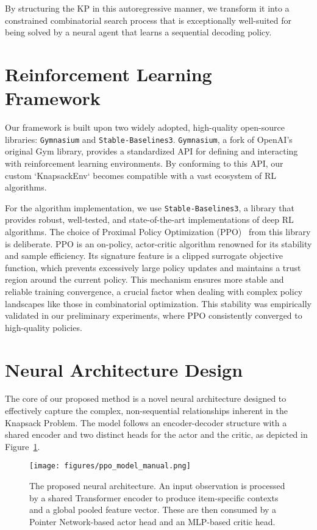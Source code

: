 By structuring the KP in this autoregressive manner, we transform it into a constrained combinatorial search process that is exceptionally well-suited for being solved by a neural agent that learns a sequential decoding policy.

\section{Reinforcement Learning Framework}
Our framework is built upon two widely adopted, high-quality open-source libraries: \texttt{Gymnasium} and \texttt{Stable-Baselines3}. \texttt{Gymnasium}, a fork of OpenAI's original Gym library, provides a standardized API for defining and interacting with reinforcement learning environments. By conforming to this API, our custom `KnapsackEnv` becomes compatible with a vast ecosystem of RL algorithms.

For the algorithm implementation, we use \texttt{Stable-Baselines3}, a library that provides robust, well-tested, and state-of-the-art implementations of deep RL algorithms. The choice of Proximal Policy Optimization (PPO)~\cite{schulmanProximalPolicyOptimization2017} from this library is deliberate. PPO is an on-policy, actor-critic algorithm renowned for its stability and sample efficiency. Its signature feature is a clipped surrogate objective function, which prevents excessively large policy updates and maintains a trust region around the current policy. This mechanism ensures more stable and reliable training convergence, a crucial factor when dealing with complex policy landscapes like those in combinatorial optimization. This stability was empirically validated in our preliminary experiments, where PPO consistently converged to high-quality policies.

\section{Neural Architecture Design}
The core of our proposed method is a novel neural architecture designed to effectively capture the complex, non-sequential relationships inherent in the Knapsack Problem. The model follows an encoder-decoder structure with a shared encoder and two distinct heads for the actor and the critic, as depicted in Figure~\ref{fig:model_architecture}.

\begin{figure}[H]
    \centering
    \texttt{[image: figures/ppo\_model\_manual.png]}
    \caption{The proposed neural architecture. An input observation is processed by a shared Transformer encoder to produce item-specific contexts and a global pooled feature vector. These are then consumed by a Pointer Network-based actor head and an MLP-based critic head.}
    \label{fig:model_architecture}
\end{figure}

